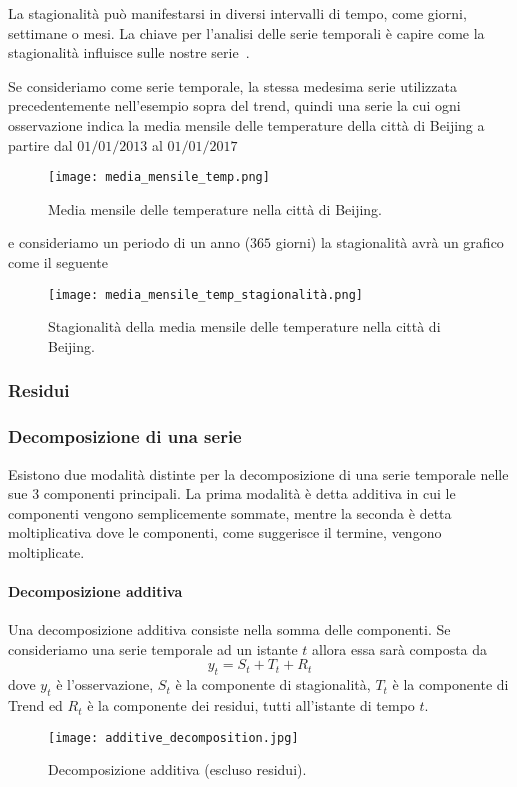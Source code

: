 La stagionalità può manifestarsi in diversi intervalli di tempo, 
come giorni, settimane o mesi. La chiave per l'analisi delle serie temporali 
è capire come la stagionalità influisce sulle nostre serie~\cite{md:seasonality}.
\begin{esempio} 

    Se consideriamo come serie temporale, la stessa medesima serie utilizzata 
    precedentemente nell'esempio sopra del trend, quindi una serie la cui 
    ogni osservazione indica la media mensile delle temperature 
    della città di Beijing a partire dal $01/01/2013$ al $01/01/2017$

    \begin{figure}[H]
        \centering
        \texttt{[image: media\_mensile\_temp.png]}
        \caption{Media mensile delle temperature nella città di Beijing.}
    \end{figure}

    e consideriamo un periodo di un anno ($365$ giorni) la stagionalità avrà un grafico
    come il seguente

    \begin{figure}[H]
        \centering
        \texttt{[image: media\_mensile\_temp\_stagionalità.png]}
        \caption{Stagionalità della media mensile delle temperature nella città di Beijing.}
    \end{figure}

\end{esempio}


\subsubsection{Residui}



\subsubsection{Decomposizione di una serie}
Esistono due modalità distinte per la decomposizione di
una serie temporale nelle sue 3 componenti principali. La prima modalità è detta
additiva in cui le componenti vengono semplicemente sommate, mentre la seconda
è detta moltiplicativa dove le componenti, come suggerisce il termine, 
vengono moltiplicate.

\paragraph{Decomposizione additiva} 
Una decomposizione additiva consiste nella
somma delle componenti. Se consideriamo una serie temporale ad un 
istante $t$ allora essa sarà composta da
\[ y_t = S_t + T_t + R_t \]
dove $y_t$ è l'osservazione, $S_t$ è la componente di stagionalità, 
$T_t$ è la componente di Trend ed $R_t$ è la componente dei residui, tutti
all'istante di tempo $t$.
\begin{figure}[H]
    \centering
    \texttt{[image: additive\_decomposition.jpg]}
    \caption{Decomposizione additiva (escluso residui).}
\end{figure}


